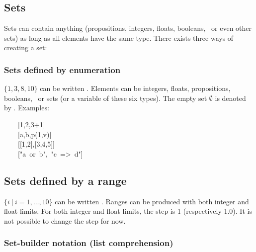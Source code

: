 \subsection{Sets}\label{sec-sets}%

\noindent Sets can contain anything (propositions, integers, floats,
booleans,~ or even other sets) as long
as all elements have the same type. There exists three ways of creating a
set:%

\subsubsection{Sets defined by enumeration}\label{sec-sets-defined-by-enumeration}%

\noindent$\{1,3,8,10\}$ can be written . Elements can be integers,
floats, propositions, booleans,~ or
sets (or a variable of these six types). The empty set $\emptyset$ is
denoted by \mdcode{{}[]}. Examples:%
\begin{mdpre}%
\noindent~~~~{}[{1},{2},{3}+{1}]\\
~~~~{}[a,b,p({1},v)]\\
~~~~{}[{}[{1},{2}],{}[{3},{4},{5}]]\\
~~~~{}["a~or~b",~"c~=\textgreater{}~d"]%
\end{mdpre}
\subsection{Sets defined by a range}\label{sec-sets-defined-by-a-range}%

\noindent$\{i~|~i=1,\dots,10\}$ can be written . Ranges can
be produced with both integer and float limits. For both integer and float
limits, the step is 1 (respectively 1.0). It is not possible to change the step for now.%

\subsubsection{Set-builder notation (list comprehension)}\label{set-builder}%

